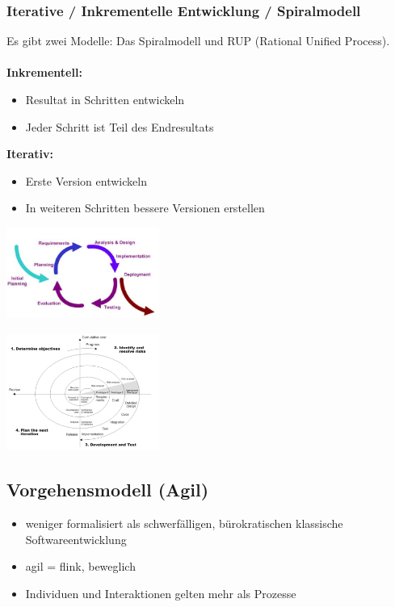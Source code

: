 \subsubsection{Iterative / Inkrementelle Entwicklung / Spiralmodell}
\begin{minipage}{8cm}
Es gibt zwei Modelle: Das Spiralmodell und RUP (Rational Unified Process).\\
\\
	\textbf{Inkrementell:}
		\begin{itemize}
			\item Resultat in Schritten entwickeln
			\item Jeder Schritt ist Teil des Endresultats
		\end{itemize}
	\textbf{Iterativ:}
		\begin{itemize}					
			\item Erste Version entwickeln
			\item In weiteren Schritten bessere Versionen erstellen
		\end{itemize}
\end{minipage}
\begin{minipage}{6cm}
	\includegraphics[width=5cm]{images/iterative_entwicklung.png}
\end{minipage}
\begin{minipage}{8cm}
	\includegraphics[width=5cm]{images/spiral_modell.png}
\end{minipage}


\subsection{Vorgehensmodell (Agil)}
\begin{itemize}
	\item weniger formalisiert als schwerfälligen, bürokratischen klassische Softwareentwicklung
	\item agil = flink, beweglich
	\item Individuen und Interaktionen gelten mehr als Prozesse
\end{itemize}

